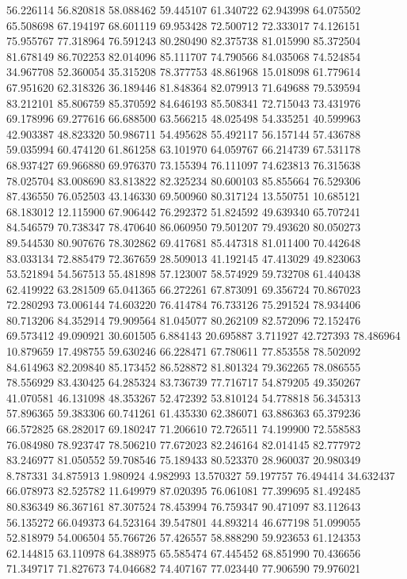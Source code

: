 56.226114
56.820818
58.088462
59.445107
61.340722
62.943998
64.075502
65.508698
67.194197
68.601119
69.953428
72.500712
72.333017
74.126151
75.955767
77.318964
76.591243
80.280490
82.375738
81.015990
85.372504
81.678149
86.702253
82.014096
85.111707
74.790566
84.035068
74.524854
34.967708
52.360054
35.315208
78.377753
48.861968
15.018098
61.779614
67.951620
62.318326
36.189446
81.848364
82.079913
71.649688
79.539594
83.212101
85.806759
85.370592
84.646193
85.508341
72.715043
73.431976
69.178996
69.277616
66.688500
63.566215
48.025498
54.335251
40.599963
42.903387
48.823320
50.986711
54.495628
55.492117
56.157144
57.436788
59.035994
60.474120
61.861258
63.101970
64.059767
66.214739
67.531178
68.937427
69.966880
69.976370
73.155394
76.111097
74.623813
76.315638
78.025704
83.008690
83.813822
82.325234
80.600103
85.855664
76.529306
87.436550
76.052503
43.146330
69.500960
80.317124
13.550751
10.685121
68.183012
12.115900
67.906442
76.292372
51.824592
49.639340
65.707241
84.546579
70.738347
78.470640
86.060950
79.501207
79.493620
80.050273
89.544530
80.907676
78.302862
69.417681
85.447318
81.011400
70.442648
83.033134
72.885479
72.367659
28.509013
41.192145
47.413029
49.823063
53.521894
54.567513
55.481898
57.123007
58.574929
59.732708
61.440438
62.419922
63.281509
65.041365
66.272261
67.873091
69.356724
70.867023
72.280293
73.006144
74.603220
76.414784
76.733126
75.291524
78.934406
80.713206
84.352914
79.909564
81.045077
80.262109
82.572096
72.152476
69.573412
49.090921
30.601505
6.884143
20.695887
3.711927
42.727393
78.486964
10.879659
17.498755
59.630246
66.228471
67.780611
77.853558
78.502092
84.614963
82.209840
85.173452
86.528872
81.801324
79.362265
78.086555
78.556929
83.430425
64.285324
83.736739
77.716717
54.879205
49.350267
41.070581
46.131098
48.353267
52.472392
53.810124
54.778818
56.345313
57.896365
59.383306
60.741261
61.435330
62.386071
63.886363
65.379236
66.572825
68.282017
69.180247
71.206610
72.726511
74.199900
72.558583
76.084980
78.923747
78.506210
77.672023
82.246164
82.014145
82.777972
83.246977
81.050552
59.708546
75.189433
80.523370
28.960037
20.980349
8.787331
34.875913
1.980924
4.982993
13.570327
59.197757
76.494414
34.632437
66.078973
82.525782
11.649979
87.020395
76.061081
77.399695
81.492485
80.836349
86.367161
87.307524
78.453994
76.759347
90.471097
83.112643
56.135272
66.049373
64.523164
39.547801
44.893214
46.677198
51.099055
52.818979
54.006504
55.766726
57.426557
58.888290
59.923653
61.124353
62.144815
63.110978
64.388975
65.585474
67.445452
68.851990
70.436656
71.349717
71.827673
74.046682
74.407167
77.023440
77.906590
79.976021
